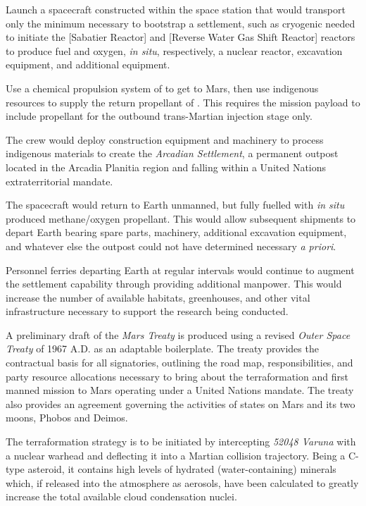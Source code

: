 \item Launch a spacecraft constructed within the space station that would transport only the minimum necessary to bootstrap a settlement, such as cryogenic  needed to initiate the [Sabatier Reactor] and [Reverse Water Gas Shift Reactor] reactors to produce fuel and oxygen, {\it in situ}, respectively, a nuclear reactor, excavation equipment, and additional equipment.

\item Use a chemical propulsion system of  to get to Mars, then use indigenous resources to supply the return propellant of . This requires the mission payload to include propellant for the outbound trans-Martian injection stage only.

\item The crew would deploy construction equipment and machinery to process indigenous materials to create the {\it Arcadian Settlement}, a permanent outpost located in the Arcadia Planitia region and falling within a United Nations extraterritorial mandate.

\item The spacecraft would return to Earth unmanned, but fully fuelled with {\it in situ} produced methane/oxygen propellant. This would allow subsequent shipments to depart Earth bearing spare parts, machinery, additional excavation equipment, and whatever else the outpost could not have determined necessary {\it a priori}.

\item Personnel ferries departing Earth at regular intervals would continue to augment the settlement capability through providing additional manpower. This would increase the number of available habitats, greenhouses, and other vital infrastructure necessary to support the research being conducted.
\stopitemize

A preliminary draft of the {\it Mars Treaty} is produced using a revised {\it Outer Space Treaty} of 1967 A.D. as an adaptable boilerplate. The treaty provides the contractual basis for all signatories, outlining the road map, responsibilities, and party resource allocations necessary to bring about the terraformation and first manned mission to Mars operating under a United Nations mandate. The treaty also provides an agreement governing the activities of states on Mars and its two moons, Phobos and Deimos.

The terraformation strategy is to be initiated by intercepting {\it 52048 Varuna} with a nuclear warhead and deflecting it into a Martian collision trajectory. Being a C-type asteroid, it contains high levels of hydrated (water-containing) minerals which, if released into the atmosphere as aerosols, have been calculated to greatly increase the total available cloud condensation nuclei.

